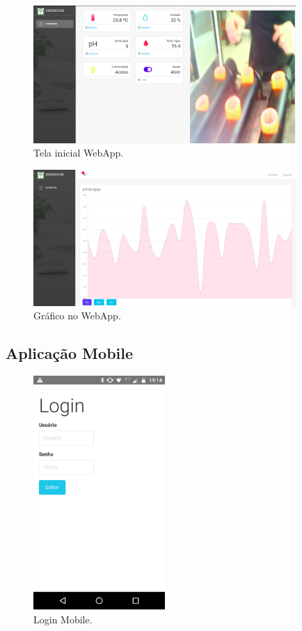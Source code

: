 	\begin{figure}[H]
		\centering
		\includegraphics[width=10cm]{figuras/webapp.png}
		\caption{Tela inicial WebApp.}
		\label{webapp}
	\end{figure}
	
	\begin{figure}[H]
		\centering
		\includegraphics[width=10cm]{figuras/grafWeb.png}
		\caption{Gráfico no WebApp.}
		\label{grafweb}
	\end{figure}
	
\subsection{Aplicação Mobile}
	
	\begin{figure}[H]
		\centering
		\includegraphics[width=5cm]{figuras/loginMob.jpeg}
		\caption{Login Mobile.}
		\label{loginMob}
	\end{figure}
	
